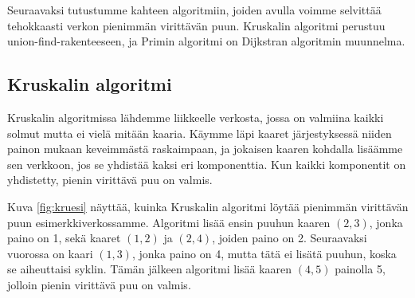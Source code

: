 Seuraavaksi tutustumme kahteen algoritmiin, joiden avulla voimme
selvittää tehokkaasti verkon pienimmän virittävän puun.
Kruskalin algoritmi perustuu union-find-rakenteeseen,
ja Primin algoritmi on Dijkstran algoritmin muunnelma.

\subsection{Kruskalin algoritmi}

Kruskalin algoritmissa lähdemme liikkeelle verkosta,
jossa on valmiina kaikki solmut mutta ei vielä mitään kaaria.
Käymme läpi kaaret järjestyksessä niiden painon mukaan
keveimmästä raskaimpaan, ja jokaisen kaaren kohdalla
lisäämme sen verkkoon, jos se yhdistää kaksi eri komponenttia.
Kun kaikki komponentit on yhdistetty, pienin virittävä puu on valmis.

Kuva \ref{fig:kruesi} näyttää, kuinka Kruskalin algoritmi löytää pienimmän virittävän
puun esimerkkiverkossamme.
Algoritmi lisää ensin puuhun kaaren $(2,3)$, jonka paino on 1,
sekä kaaret $(1,2)$ ja $(2,4)$, joiden paino on 2.
Seuraavaksi vuorossa on kaari $(1,3)$, jonka paino on 4,
mutta tätä ei lisätä puuhun, koska se aiheuttaisi syklin.
Tämän jälkeen algoritmi lisää kaaren $(4,5)$ painolla 5,
jolloin pienin virittävä puu on valmis.

